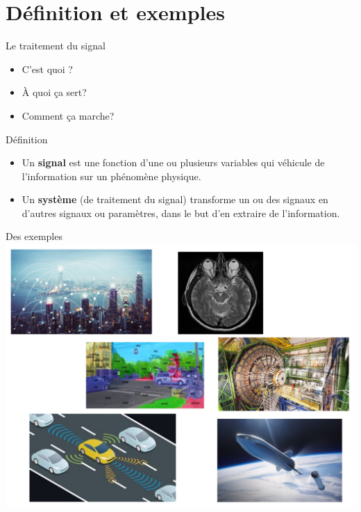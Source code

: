 \documentclass{beamer}
\begin{document}
\section{Définition et exemples}
\label{sec:label}
\begin{frame}{Le traitement du signal}
  \begin{itemize}
    \item C'est quoi ?
    \item À quoi ça sert?
    \item Comment ça marche?
  \end{itemize}\pause
  \begin{block}{Définition}
    \begin{itemize}
      \item Un \textbf{signal} est une fonction d'une ou plusieurs variables qui véhicule de l'information sur un phénomène physique.\pause
      \item Un \textbf{système} (de traitement du signal) transforme un ou des signaux en d'autres signaux ou paramètres, dans le but d'en extraire de l'information.
      \end{itemize}
  \end{block}
\end{frame}
\begin{frame}{Des exemples}
  \centering
  \includegraphics[width=\textwidth]{buzz.png}
\end{frame}
\end{document}
